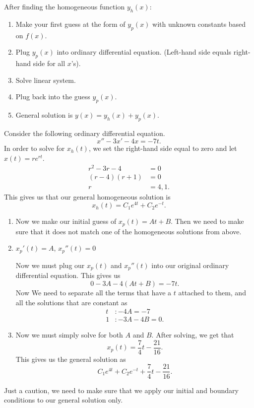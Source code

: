\begin{theorem}
  After finding the homogeneous function $y_h(x):$
  \begin{enumerate}
    \item Make your first guess at the form of $y_p(x)$ with unknown constants based on $f(x)$.
    \item Plug $y_p(x)$ into ordinary differential equation. (Left-hand side equals right-hand side for all $x$'s).
    \item Solve linear system.
    \item Plug back into the guess $y_p(x)$.
    \item General solution is $y(x)=y_h(x)+y_p(x)$.
  \end{enumerate}
\end{theorem}

\begin{eg}
  Consider the following ordinary differential equation.
  \[
  x''-3x'-4x=-7t
  .\] 
  In order to solve for $x_h(t)$, we set the right-hand side equal to zero and let $x(t)=re^{rt}$.
  \begin{align*}
    r^2-3r-4&=0\\
    (r-4)(r+1)&=0\\
    r&=4,1
  .\end{align*}
  This gives us that our general homogeneous solution is 
  \[
    x_h(t)=C_1e^{4t}+C_2e^{-t}
  .\] 
  \begin{enumerate}
    \item Now we make our initial guess of $x_p(t)=At+B$. Then we need to make sure that it does not match one of the homogeneous solutions from above.
    \item $x_p'(t)=A$, $x_p''(t)=0$
  
  Now we must plug our $x_p(t)$ and $x_p''(t)$ into our original ordinary differential equation. This gives us 
  \[
    0-3A-4(At+B)=-7t
  .\] 
  Now We need to separate all the terms that have a $t$ attached to them, and all the solutions that are constant as 
  \begin{align*}
    t&:-4A=-7\\
    1&:-3A-4B=0
  .\end{align*}
  \item Now we must simply solve for both $A$ and $B$. After solving, we get that 
  \[
    x_p(t)=\frac{7}{4}t-\frac{21}{16}
  .\] 
  This gives us the general solution as
  \[
  C_1e^{4t}+C_2e^{-t}+\frac{7}{4}t-\frac{21}{16}
  .\] 
  \end{enumerate}
  Just a caution, we need to make sure that we apply our initial and boundary conditions to our general solution only.
\end{eg}

